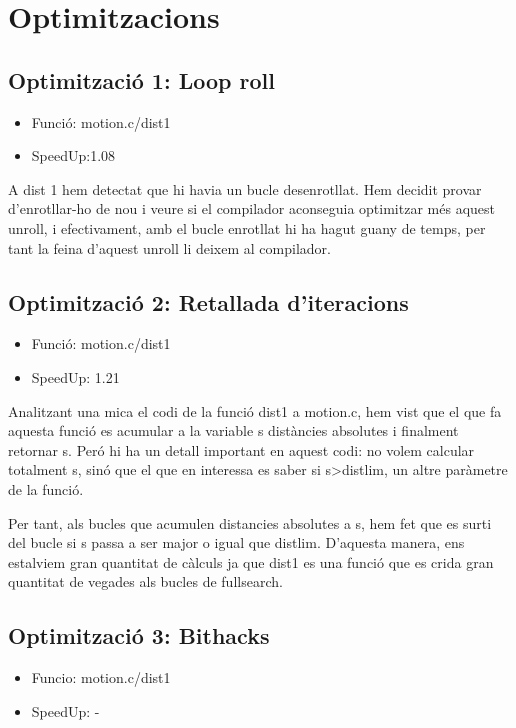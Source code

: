 

\chapter{Optimitzacions}

\section{Optimitzaci\'o 1: Loop roll}
\begin{itemize}
\item{Funció: motion.c/dist1}
\item{SpeedUp:1.08}
\end{itemize}

A dist 1 hem detectat que hi havia un bucle desenrotllat. Hem decidit provar d'enrotllar-ho de nou i veure si el compilador aconseguia optimitzar més aquest unroll, i efectivament, amb el bucle enrotllat hi ha hagut guany de temps, per tant la feina d'aquest unroll li deixem al compilador.
 

\section{Optimitzaci\'o 2: Retallada d'iteracions}
\begin{itemize}
\item{Funció: motion.c/dist1}
\item{SpeedUp: 1.21}
\end{itemize}

Analitzant una mica el codi de la funció dist1 a motion.c, hem vist que el que fa aquesta funció es acumular a la variable s distàncies absolutes i finalment retornar s. Peró hi ha un detall important en aquest codi: no volem calcular totalment s, sinó que el que en interessa es saber si s>distlim, un altre paràmetre de la funció.

Per tant, als bucles que acumulen distancies absolutes a s, hem fet que es surti del bucle si s passa a ser major o igual que distlim. D'aquesta manera, ens estalviem gran quantitat de càlculs ja que dist1 es una funció que es crida gran quantitat de vegades als bucles de fullsearch.


\section{Optimitzaci\'o 3: Bithacks}
\begin{itemize}
\item{Funcio: motion.c/dist1}
\item{SpeedUp: -}
\end{itemize}

